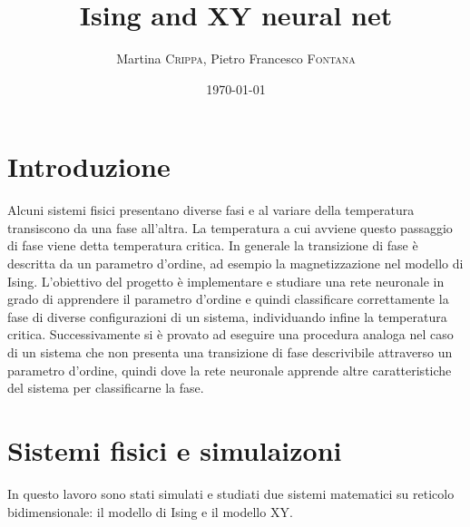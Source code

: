 \documentclass{article}
\title{Ising and XY neural net} %
\author{Martina \textsc{Crippa}, Pietro Francesco \textsc{Fontana}} %
\date{\today} %
\begin{document}
\maketitle %




\section{Introduzione}
Alcuni sistemi fisici presentano diverse fasi e al variare della temperatura transiscono da una fase all'altra. La temperatura a cui avviene questo passaggio di fase viene detta temperatura critica. In generale la transizione di fase è descritta da un parametro d'ordine, ad esempio la magnetizzazione nel modello di Ising. L'obiettivo del progetto è implementare e studiare una rete neuronale in grado di apprendere il parametro d'ordine e quindi classificare correttamente la fase di diverse configurazioni di un sistema, individuando infine la temperatura critica. Successivamente si è provato ad eseguire una procedura analoga nel caso di un sistema che non presenta una transizione di fase descrivibile attraverso un parametro d'ordine, quindi dove la rete neuronale apprende altre caratteristiche del sistema per classificarne la fase.


\section{Sistemi fisici e simulaizoni}
In questo lavoro sono stati simulati e studiati due sistemi matematici su reticolo bidimensionale:  il modello di Ising e il modello XY.
\end{document}
